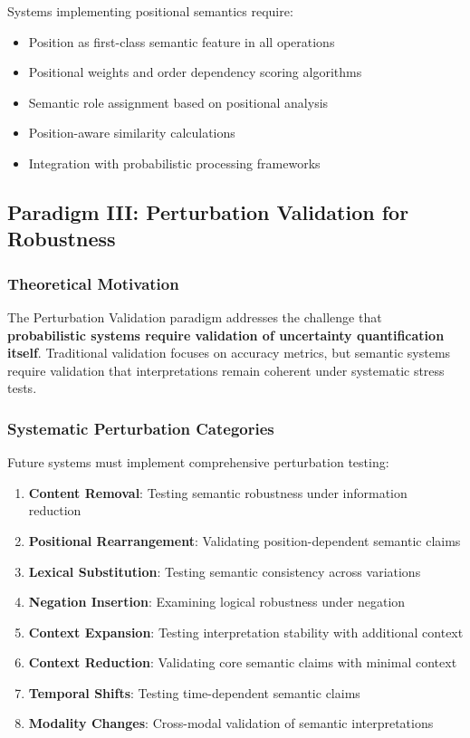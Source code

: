 \documentclass[12pt,a4paper,twoside]{article}
\begin{document}
Systems implementing positional semantics require:

\begin{itemize}
\item Position as first-class semantic feature in all operations
\item Positional weights and order dependency scoring algorithms
\item Semantic role assignment based on positional analysis
\item Position-aware similarity calculations
\item Integration with probabilistic processing frameworks
\end{itemize}

\subsection{Paradigm III: Perturbation Validation for Robustness}

\subsubsection{Theoretical Motivation}

The Perturbation Validation paradigm addresses the challenge that \textbf{probabilistic systems require validation of uncertainty quantification itself}. Traditional validation focuses on accuracy metrics, but semantic systems require validation that interpretations remain coherent under systematic stress tests.

\subsubsection{Systematic Perturbation Categories}

Future systems must implement comprehensive perturbation testing:

\begin{enumerate}
\item \textbf{Content Removal}: Testing semantic robustness under information reduction
\item \textbf{Positional Rearrangement}: Validating position-dependent semantic claims
\item \textbf{Lexical Substitution}: Testing semantic consistency across variations
\item \textbf{Negation Insertion}: Examining logical robustness under negation
\item \textbf{Context Expansion}: Testing interpretation stability with additional context
\item \textbf{Context Reduction}: Validating core semantic claims with minimal context
\item \textbf{Temporal Shifts}: Testing time-dependent semantic claims
\item \textbf{Modality Changes}: Cross-modal validation of semantic interpretations
\end{enumerate}
\end{document}
